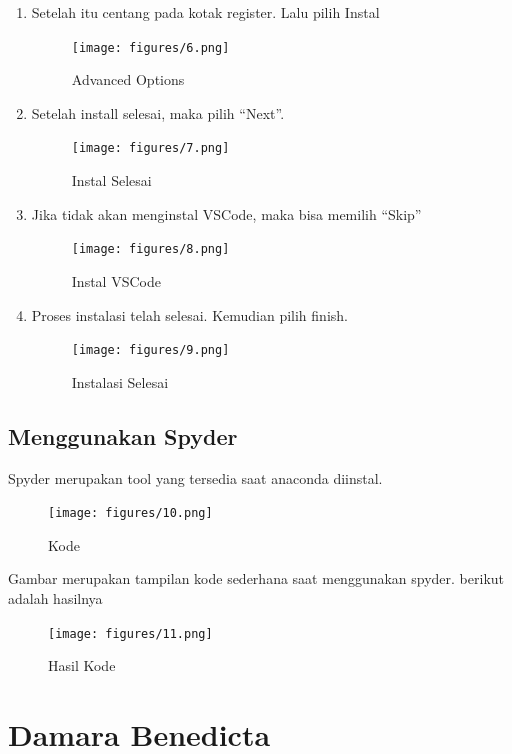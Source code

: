 \begin{enumerate}
\item Setelah itu centang pada kotak register. Lalu pilih Instal
\begin{figure}[!htbp]
    \centering
    \texttt{[image: figures/6.png]}
    \caption{Advanced Options}
    \label{options}
    \end{figure}

\item Setelah install selesai, maka pilih “Next”.
\begin{figure}[!htbp]
    \centering
    \texttt{[image: figures/7.png]}
    \caption{Instal Selesai}
    \label{instal}
    \end{figure}

\item Jika tidak akan menginstal VSCode, maka bisa memilih “Skip”
\begin{figure}[!htbp]
    \centering
    \texttt{[image: figures/8.png]}
    \caption{Instal VSCode}
    \label{vscode}
    \end{figure}

\item Proses instalasi telah selesai. Kemudian pilih finish.
\begin{figure}[!htbp]
    \centering
    \texttt{[image: figures/9.png]}
    \caption{Instalasi Selesai}
    \label{finish}
    \end{figure}
\end{enumerate}

\subsection{Menggunakan Spyder}
Spyder merupakan tool yang tersedia saat anaconda diinstal.
\begin{figure}[!htbp]
    \centering
    \texttt{[image: figures/10.png]}
    \caption{Kode}
    \label{code}
    \end{figure}

Gambar merupakan tampilan kode sederhana saat menggunakan spyder. berikut adalah hasilnya
\begin{figure}[!htbp]
    \centering
    \texttt{[image: figures/11.png]}
    \caption{Hasil Kode}
    \label{hasil}
    \end{figure}
\section{Damara Benedicta}
